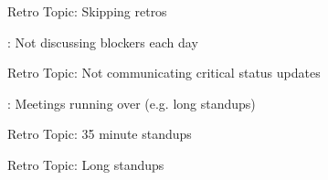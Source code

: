 \quad \quad \quad Retro Topic: Skipping retros

\quad {}: Not discussing blockers each day

\quad \quad \quad Retro Topic: Not communicating critical status updates

\quad {}: Meetings running over (e.g. long standups)

\quad \quad \quad Retro Topic: 35 minute standups

\quad \quad \quad Retro Topic: Long standups
















